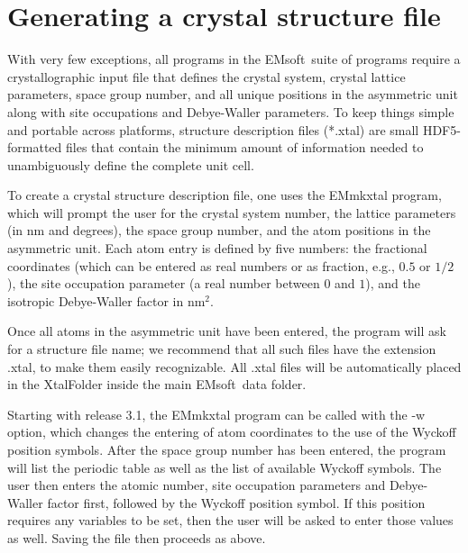 \documentclass[DIV=calc, paper=letter, fontsize=11pt]{scrartcl}	 %
\newcommand{\ctp}{\textsf{EMsoft}}
\begin{document}
\newpage
\section{Generating a crystal structure file\label{sec:f90input5}}

With very few exceptions, all programs in the \ctp\ suite of programs require a crystallographic input file that defines the 
crystal system, crystal lattice parameters, space group number, and all unique positions in the 
asymmetric unit along with site occupations and Debye-Waller parameters.  To keep things simple and 
portable across platforms, structure description files (*.xtal) are small HDF5-formatted files that contain the minimum
amount of information needed to unambiguously define the complete unit cell.  

To create a crystal structure description file, one uses the \textsf{EMmkxtal} program, which will prompt
the user for the crystal system number, the lattice parameters (in nm and degrees), the space group number,
and the atom positions in the asymmetric unit.  Each atom entry is defined by five numbers: the fractional
coordinates (which can be entered as real numbers or as fraction, e.g., $0.5$ or $1/2$), the site 
occupation parameter (a real number between $0$ and $1$), and the isotropic Debye-Waller factor in nm$^{2}$.

Once all atoms in the asymmetric unit have been entered, the program will ask for a structure file name; we
recommend that all such files have the extension \textsf{.xtal}, to make them easily recognizable.  All .xtal files
will be automatically placed in the \textsf{XtalFolder} inside the main \ctp\ data folder.

Starting with release 3.1, the \textsf{EMmkxtal} program can be called with the \textsf{-w} option, which changes
the entering of atom coordinates to the use of the Wyckoff position symbols.  After the space group number
has been entered, the program will list the periodic table as well as the list of available Wyckoff symbols.  The user then
enters the atomic number, site occupation parameters and Debye-Waller factor first, followed by the Wyckoff position 
symbol.  If this position requires any variables to be set, then the user will be asked to enter those values as well.
Saving the file then proceeds as above.



%
%
%
\end{document}
